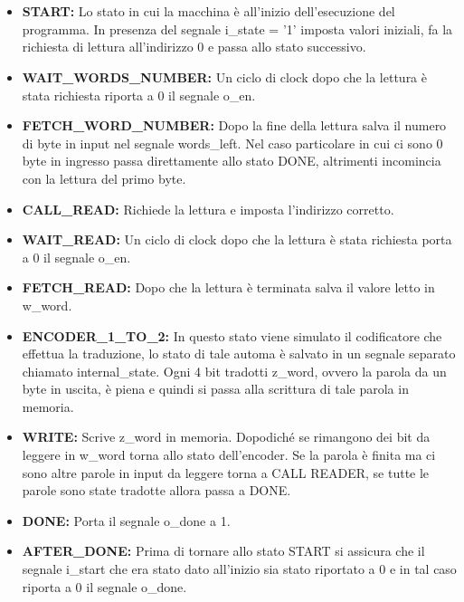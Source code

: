 \documentclass{article}
\begin{document}
\\
\\
\begin{itemize}
	\item \textbf{START:} Lo stato in cui la macchina è all'inizio dell'esecuzione del programma. In presenza del segnale i\_state = '1' imposta valori iniziali, fa la richiesta di lettura all'indirizzo 0 e passa allo stato successivo.
	\item \textbf{WAIT\_WORDS\_NUMBER:} Un ciclo di clock dopo che la lettura è stata richiesta riporta a 0 il segnale o\_en.
	\item \textbf{FETCH\_WORD\_NUMBER:} Dopo la fine della lettura salva il numero di byte in input nel segnale words\_left. Nel caso particolare in cui ci sono 0 byte in ingresso passa direttamente allo stato DONE, altrimenti incomincia con la lettura del primo byte.
	\item \textbf{CALL\_READ:} Richiede la lettura e imposta l'indirizzo corretto.
	\item \textbf{WAIT\_READ:} Un ciclo di clock dopo che la lettura è stata richiesta porta a 0 il segnale o\_en.
	\item \textbf{FETCH\_READ:} Dopo che la lettura è terminata salva il valore letto in w\_word.
	\item \textbf{ENCODER\_1\_TO\_2:} In questo stato viene simulato il codificatore che effettua la traduzione, lo stato di tale automa è salvato in un segnale separato chiamato internal\_state. Ogni 4 bit tradotti z\_word, ovvero la parola da un byte in uscita, è piena e quindi si passa alla scrittura di tale parola in memoria.
	\item \textbf{WRITE:} Scrive z\_word in memoria. Dopodiché se rimangono dei bit da leggere in w\_word torna allo stato dell'encoder. Se la parola è finita ma ci sono altre parole in input da leggere torna a CALL READER, se tutte le parole sono state tradotte allora passa a DONE.
	\item \textbf{DONE:} Porta il segnale o\_done a 1.
	\item \textbf{AFTER\_DONE:} Prima di tornare allo stato START si assicura che il segnale i\_start che era stato dato all'inizio sia stato riportato a 0 e in tal caso riporta a 0 il segnale o\_done.
\end{itemize}
\pagebreak
\end{document}
